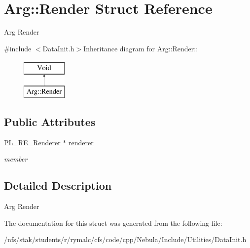 \hypertarget{structArg_1_1Render}{
\section{Arg::Render Struct Reference}
\label{structArg_1_1Render}
}


Arg Render  


{\ttfamily \#include $<$DataInit.h$>$}Inheritance diagram for Arg::Render::\begin{figure}[H]
\begin{center}
\leavevmode
\includegraphics[height=2cm]{structArg_1_1Render}
\end{center}
\end{figure}
\subsection*{Public Attributes}
\begin{DoxyCompactItemize}
\item 
\hypertarget{structArg_1_1Render_a939f305e81e0ccf1a5a26d43883f6a26}{
\hyperlink{classPlatform_1_1Renderer_1_1Renderer}{PL\_\-RE\_\-Renderer} $\ast$ \hyperlink{structArg_1_1Render_a939f305e81e0ccf1a5a26d43883f6a26}{renderer}}
\label{structArg_1_1Render_a939f305e81e0ccf1a5a26d43883f6a26}

\begin{DoxyCompactList}\small\item\em member \item\end{DoxyCompactList}\end{DoxyCompactItemize}


\subsection{Detailed Description}
Arg Render 

The documentation for this struct was generated from the following file:\begin{DoxyCompactItemize}
\item 
/nfs/stak/students/r/rymalc/cfs/code/cpp/Nebula/Include/Utilities/DataInit.h\end{DoxyCompactItemize}
